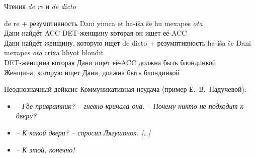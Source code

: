 \documentclass{beamer}
\begin{document}
\begin{frame}{Чтения \textit{de re} и \textit{de dicto}}
\smallskip
{\footnotesize	
\begin{exe}
	\ex de re + резумптивность
		\gll Dani yimca et ha-i\v{s}a \v{s}e hu mexapes \textit{ota}\\
             Дани найдёт ACC DET-женщину которая он ищет её-ACC\\
		\glt Дани найдёт женщину, которую ищет
	\ex de dicto + резумптивность
	    \gll ha-i\v{s}a \v{s}e Dani mexapes \textit{ota} crixa lihyot blondit\\
 	         DET-женщина которая Дани ищет её-ACC должна быть блондинкой\\
	    \glt Женщина, которую ищет Дани, должна быть блондинкой
\end{exe}		    
}
\end{frame}

\begin{frame}{Неоднозначный дейксис}
Коммуникативная неудача (пример Е.~В.~Падучевой):\\
\bigskip
\begin{itemize}
	\item[] \textit{-- Где привратник? -- гневно кричала она. -- Почему никто не подходит к двери?}
	\item[] \textit{-- К какой двери? -- спросил Лягушонок. [\dots]}
	\item[] \textit{-- К этой, конечно!}
\end{itemize}
\end{frame}
\end{document}
